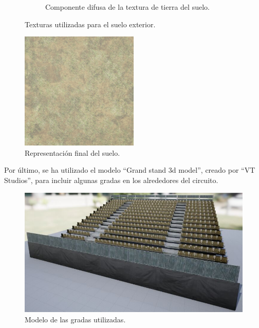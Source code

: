 \begin{figure}[H]
\begin{subfigure}[t]{0.48\textwidth}
        \caption{Componente difusa de la textura de tierra del suelo.}
        \label{fig:ground066}
    \end{subfigure}    
    \caption{Texturas utilizadas para el suelo exterior.}
    \label{fig:exterior}
\end{figure}

\begin{figure}[H]
    \centering
    \includegraphics[width=0.5\textwidth]{imagenes/converted/sueloTextFinal}
    \caption{Representación final del suelo.}
    \label{fig:sueloFinal}
\end{figure}

Por último, se ha utilizado el modelo ``Grand stand 3d model''\cite{grandstand}, creado por ``VT Studios'', para incluir algunas gradas en los alrededores del circuito.

\begin{figure}[H]
    \centering
    \includegraphics[width=\textwidth]{imagenes/converted/grandstand.jpg}
    \caption{Modelo de las gradas utilizadas.}
    \label{fig:grandstand}
\end{figure}